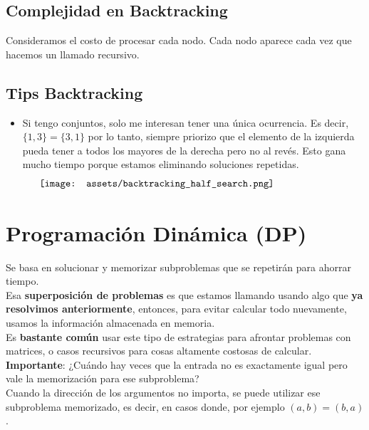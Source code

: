 \documentclass[10pt,a4paper]{article}
\begin{document}
\subsection*{Complejidad en Backtracking}
Consideramos el costo de procesar cada nodo. Cada nodo aparece cada vez que hacemos un llamado recursivo.  
\subsection*{Tips Backtracking}
\begin{itemize}
    \item Si tengo conjuntos, solo me interesan tener una única ocurrencia. Es decir, $\{1, 3\} = \{3, 1\}$ por lo tanto, siempre priorizo que el elemento de la izquierda pueda tener a todos los mayores de la derecha pero no al revés. Esto gana mucho tiempo porque estamos eliminando soluciones repetidas.
    \[\begin{minipage}[b]{0.9\textwidth}
    \texttt{[image: assets/backtracking\_half\_search.png]}
    \end{minipage}\]
\end{itemize}
\section*{Programación Dinámica (DP)}
Se basa en solucionar y memorizar subproblemas que se repetirán para ahorrar tiempo. \\
Esa \textbf{superposición de problemas} es que estamos llamando usando algo que \textbf{ya resolvimos anteriormente}, entonces, para evitar calcular todo nuevamente, usamos la información almacenada en memoria. \\
Es \textbf{bastante común} usar este tipo de estrategias para afrontar problemas con matrices, o casos recursivos para cosas altamente costosas de calcular. \\
\textbf{Importante}: ¿Cuándo hay veces que la entrada no es exactamente igual pero vale la memorización para ese subproblema? \\
Cuando la dirección de los argumentos no importa, se puede utilizar ese subproblema memorizado, es decir, en casos donde, por ejemplo $(a, b) = (b, a)$.
\end{document}
